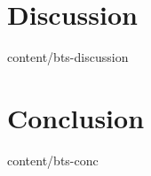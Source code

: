 \documentclass[unpublished]{btswhitepaper}
\begin{document}
\section       { Discussion                        }  { content/bts-discussion      } 

\section       { Conclusion                        }  { content/bts-conc            } 




\end{document}
